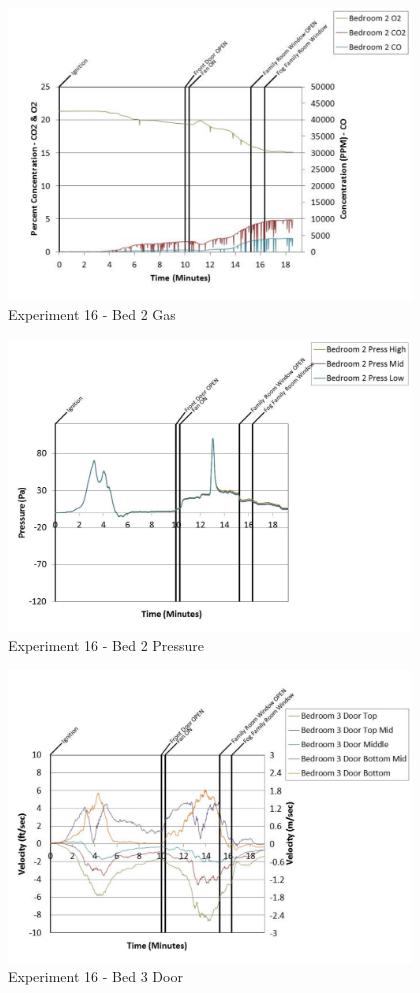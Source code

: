 \documentclass{article}
\begin{document}
\begin{appendices}
	\begin{figure}[h!]
		\centering
		\includegraphics[height=3.05in]{0_Images/Results_Charts/Exp_16_Charts/Bed2Gas.pdf}
		\caption{Experiment 16 - Bed 2 Gas}
	\end{figure}
 
	\clearpage

	\begin{figure}[h!]
		\centering
		\includegraphics[height=3.05in]{0_Images/Results_Charts/Exp_16_Charts/Bed2Pressure.pdf}
		\caption{Experiment 16 - Bed 2 Pressure}
	\end{figure}
 

	\begin{figure}[h!]
		\centering
		\includegraphics[height=3.05in]{0_Images/Results_Charts/Exp_16_Charts/Bed3Door.pdf}
		\caption{Experiment 16 - Bed 3 Door}
	\end{figure}
 

\end{appendices}
\end{document}
